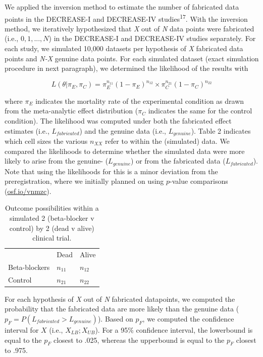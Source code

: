 \documentclass[]{article}
\begin{document}
We applied the inversion method to estimate the number of fabricated
data points in the DECREASE-I and DECREASE-IV
studies\textsuperscript{17}. With the inversion method, we iteratively
hypothesized that \emph{X} out of \emph{N} data points were fabricated
(i.e., \(0, 1, ..., N\)) in the DECREASE-I and DECREASE-IV studies
separately. For each study, we simulated 10,000 datasets per hypothesis
of \emph{X} fabricated data points and \emph{N-X} genuine data points.
For each simulated dataset (exact simulation procedure in next
paragraph), we determined the likelihood of the results with

\begin{equation}
\label{eq1}
L(\theta|\pi_{E},\pi_{C})=\pi_{E}^{n_{11}}(1-\pi_{E})^{n_{12}} \times \pi_{C}^{n_{21}}(1 - \pi_{C})^{n_{22}}
\end{equation}

where \(\pi_{E}\) indicates the mortality rate of the experimental
condition as drawn from the meta-analytic effect distribution
(\(\pi_{C}\) indicates the same for the control condition). The
likelihood was computed under both the fabricated effect estimates
(i.e., \(L_{fabricated}\)) and the genuine data (i.e., \(L_{genuine}\)).
Table 2 indicates which cell sizes the various \(n_{XX}\) refer to
within the (simulated) data. We compared the likelihoods to determine
whether the simulated data were more likely to arise from the genuine-
(\(L_{genuine}\)) or from the fabricated data (\(L_{fabricated}\)). Note
that using the likelihoods for this is a minor deviation from the
preregistration, where we initially planned on using \(p\)-value
comparisons (\href{https://osf.io/vnmzc}{osf.io/vnmzc}).

\begin{longtable}[]{@{}lll@{}}
\caption{Outcome possibilities within a simulated 2 (beta-blocker v
control) by 2 (dead v alive) clinical trial.}\tabularnewline
\toprule
& Dead & Alive\tabularnewline
Beta-blockers & \(n_{11}\) & \(n_{12}\)\tabularnewline
Control & \(n_{21}\) & \(n_{22}\)\tabularnewline
\bottomrule
\end{longtable}

For each hypothesis of \emph{X} out of \emph{N} fabricated datapoints,
we computed the probability that the fabricated data are more likely
than the genuine data (\(p_F=P(L_{fabricated}>L_{genuine})\)). Based on
\(p_F\), we computed the confidence interval for \(X\) (i.e.,
\(X_{LB};X_{UB}\)). For a 95\% confidence interval, the lowerbound is
equal to the \(p_F\) closest to .025, whereas the upperbound is equal to
the \(p_F\) closest to .975.
\end{document}
